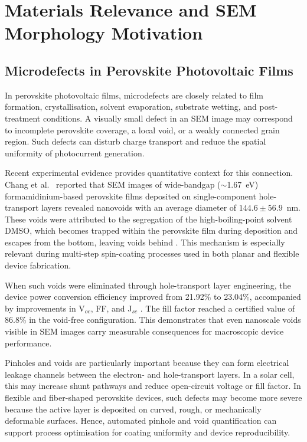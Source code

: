 \documentclass[pdflatex,sn-mathphys-num,iicol]{sn-jnl}
\theoremstyle{thmstyleone}
\theoremstyle{thmstyletwo}
\theoremstyle{thmstylethree}
\begin{document}

\section{Materials Relevance and SEM Morphology Motivation}
\label{sec:materials_relevance}

\subsection{Microdefects in Perovskite Photovoltaic Films}
\label{subsec:microdefects}

In perovskite photovoltaic films, microdefects are closely related to
film formation, crystallisation, solvent evaporation, substrate
wetting, and post-treatment conditions. A visually small defect in an
SEM image may correspond to incomplete perovskite coverage, a local
void, or a weakly connected grain region. Such defects can disturb
charge transport and reduce the spatial uniformity of photocurrent
generation.

Recent experimental evidence provides quantitative context for this
connection. Chang et al.\ \cite{chang2026} reported that SEM images
of wide-bandgap ($\sim$1.67~eV) formamidinium-based perovskite films
deposited on single-component hole-transport layers revealed nanovoids
with an average diameter of $144.6 \pm 56.9$~nm. These voids were
attributed to the segregation of the high-boiling-point solvent DMSO,
which becomes trapped within the perovskite film during deposition and
escapes from the bottom, leaving voids behind
\cite{chang2026,chen2021}. This mechanism is especially relevant
during multi-step spin-coating processes used in both planar and
flexible device fabrication.

When such voids were eliminated through hole-transport layer
engineering, the device power conversion efficiency improved from
21.92\% to 23.04\%, accompanied by improvements in V$_{oc}$, FF,
and J$_{sc}$ \cite{chang2026}. The fill factor reached a certified
value of 86.8\% in the void-free configuration. This demonstrates
that even nanoscale voids visible in SEM images carry measurable
consequences for macroscopic device performance.

Pinholes and voids are particularly important because they can form
electrical leakage channels between the electron- and hole-transport
layers. In a solar cell, this may increase shunt pathways and reduce
open-circuit voltage or fill factor. In flexible and fiber-shaped
perovskite devices, such defects may become more severe because the
active layer is deposited on curved, rough, or mechanically
deformable surfaces. Hence, automated pinhole and void quantification
can support process optimisation for coating uniformity and device
reproducibility.
\end{document}
